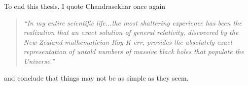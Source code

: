 \bigskip

To end this thesis, I quote Chandrasekhar once again

\begin{quote}
    \emph{``In my entire scientific life...the most shattering experience has been the realization that an exact solution of general relativity, discovered by the New Zealand mathematician Roy K
err, provides the absolutely exact representation of untold numbers of massive black holes that populate the Universe.''}
\end{quote}

and conclude that things may not be as simple as they seem.

